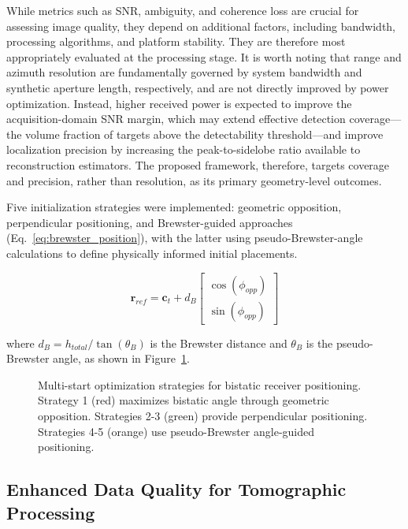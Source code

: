 \documentclass[conference]{IEEEtran}
\begin{document}
While metrics such as SNR, ambiguity, and coherence loss are crucial for assessing image quality, they depend on additional factors, including bandwidth, processing algorithms, and platform stability. They are therefore most appropriately evaluated at the processing stage. It is worth noting that range and azimuth resolution are fundamentally governed by system bandwidth and synthetic aperture length, respectively, and are not directly improved by power optimization. Instead, higher received power is expected to improve the acquisition-domain SNR margin, which may extend effective detection coverage---the volume fraction of targets above the detectability threshold---and improve localization precision by increasing the peak-to-sidelobe ratio available to reconstruction estimators. The proposed framework, therefore, targets coverage and precision, rather than resolution, as its primary geometry-level outcomes.

Five initialization strategies were implemented: geometric opposition, perpendicular positioning, and Brewster-guided approaches (Eq.~\ref{eq:brewster_position}), with the latter using pseudo-Brewster-angle calculations to define physically informed initial placements.

\begin{equation}
\mathbf{r}_{ref} = \mathbf{c}_t + d_B \begin{bmatrix} \cos(\phi_{opp}) \\ \sin(\phi_{opp}) \end{bmatrix}
\label{eq:brewster_position}
\end{equation}

where $d_B = h_{total}/\tan(\theta_B)$ is the Brewster distance and $\theta_B$ is the pseudo-Brewster angle, as shown in Figure~\ref{fig:optimization_strategies}.

\begin{figure}[ht]
\centering
\scalebox{0.55}{}
\caption{Multi-start optimization strategies for bistatic receiver positioning. Strategy 1 (red) maximizes bistatic angle through geometric opposition. Strategies 2-3 (green) provide perpendicular positioning. Strategies 4-5 (orange) use pseudo-Brewster angle-guided positioning.}
\label{fig:optimization_strategies}
\end{figure}

\subsection{Enhanced Data Quality for Tomographic Processing}
\end{document}
